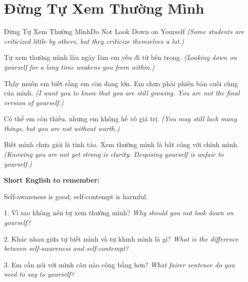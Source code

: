 \section{Đừng Tự Xem Thường Mình}
\begin{truyen}{Đừng Tự Xem Thường Mình}{Do Not Look Down on Yourself}
\textit{(Some students are criticized little by others, but they criticize themselves a lot.)}

Tự xem thường mình lâu ngày làm em yếu đi từ bên trong.
\textit{(Looking down on yourself for a long time weakens you from within.)}

Thầy muốn em biết rằng em còn đang lớn. Em chưa phải phiên bản cuối cùng của mình.
\textit{(I want you to know that you are still growing. You are not the final version of yourself.)}

Có thể em còn thiếu, nhưng em không hề vô giá trị.
\textit{(You may still lack many things, but you are not without worth.)}
\end{truyen}

\begin{baihoc}
Biết mình chưa giỏi là tỉnh táo. Xem thường mình là bất công với chính mình.
\textit{(Knowing you are not yet strong is clarity. Despising yourself is unfair to yourself.)}
\end{baihoc}

\begin{ghinhoanh}
\textbf{Short English to remember:}

Self-awareness is good; self-contempt is harmful.

\end{ghinhoanh}

\begin{tuhocnhanh}
1. Vì sao không nên tự xem thường mình? \textit{Why should you not look down on yourself?}

2. Khác nhau giữa tự biết mình và tự khinh mình là gì? \textit{What is the difference between self-awareness and self-contempt?}

3. Em cần nói với mình câu nào công bằng hơn? \textit{What fairer sentence do you need to say to yourself?}
\end{tuhocnhanh}
\ngancach

